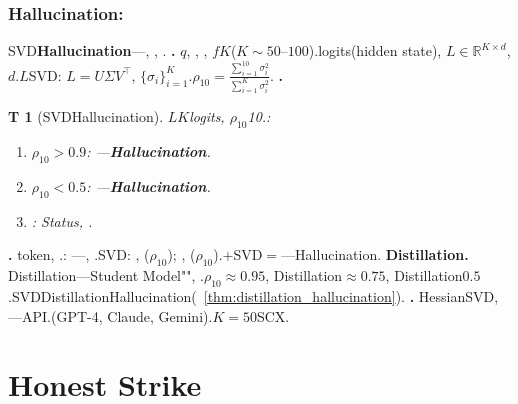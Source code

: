 \documentclass[12pt,a4paper]{article}
\newtheorem{theorem}Theorem[section]
\theoremstyle{remark}
\begin{document}
\subsubsection{Hallucination: }
SVD\textbf{Hallucination}---, , .
\textbf{.} $q$, , , $f$$K$($K \sim 50\text{--}100$).logits(hidden state), $L \in \mathbb{R}^{K \times d}$, $d$.$L$SVD: $L = U \Sigma V^\top$, $\{\sigma_i\}_{i=1}^{K}$.$\rho_{10} = \frac{\sum_{i=1}^{10} \sigma_i^2}{\sum_{i=1}^{K} \sigma_i^2}$.
\textbf{.}
\begin{theorem}[SVDHallucination]\label{thm:svd_hallucination}
$L$$K$logits, $\rho_{10}$10.: 
\begin{enumerate}[label=(\roman*),itemsep=3pt]
    \item $\rho_{10} > 0.9$: ---\textbf{Hallucination}.
    \item $\rho_{10} < 0.5$: ---\textbf{Hallucination}.
    \item : Status, .
\end{enumerate}
\end{theorem}
\textbf{.} token, .: ---, .SVD\textbf{}: , ($\rho_{10}$); , ($\rho_{10}$).$+$SVD$=$---Hallucination.
\textbf{Distillation.} Distillation---Student Model"", .$\rho_{10} \approx 0.95$, Distillation$\approx 0.75$, Distillation$0.5$.SVDDistillationHallucination(~\ref{thm:distillation_hallucination})\textbf{}.
\textbf{.} HessianSVD, \textbf{}---API.(GPT-4, Claude, Gemini).$K=50$SCX.
\section{Honest Strike}
\end{document}
